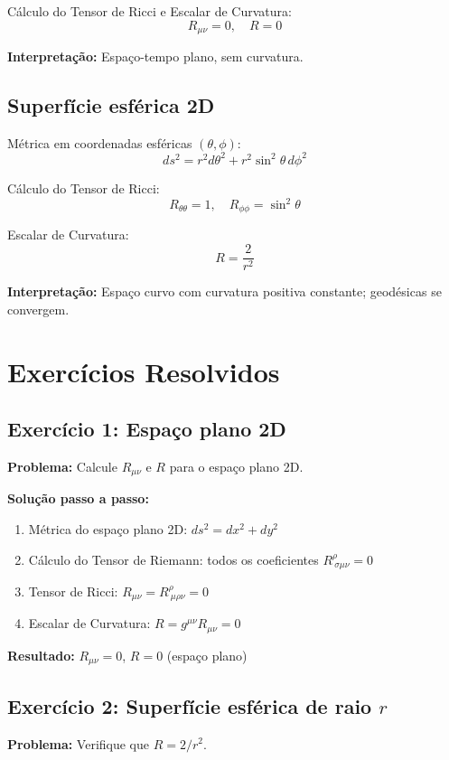 \documentclass[12pt]{article}
\begin{document}
Cálculo do Tensor de Ricci e Escalar de Curvatura:
\[
R_{\mu\nu} = 0, \quad R = 0
\]

\textbf{Interpretação:} Espaço-tempo plano, sem curvatura.

\subsection{Superfície esférica 2D}

Métrica em coordenadas esféricas $(\theta, \phi)$:
\[
ds^2 = r^2 d\theta^2 + r^2 \sin^2\theta\, d\phi^2
\]

Cálculo do Tensor de Ricci:
\[
R_{\theta\theta} = 1, \quad R_{\phi\phi} = \sin^2\theta
\]

Escalar de Curvatura:
\[
R = \frac{2}{r^2}
\]

\textbf{Interpretação:} Espaço curvo com curvatura positiva constante; geodésicas se convergem.

\section{Exercícios Resolvidos}

\subsection*{Exercício 1: Espaço plano 2D}

\textbf{Problema:} Calcule $R_{\mu\nu}$ e $R$ para o espaço plano 2D.

\textbf{Solução passo a passo:}
\begin{enumerate}
    \item Métrica do espaço plano 2D: $ds^2 = dx^2 + dy^2$
    \item Cálculo do Tensor de Riemann: todos os coeficientes $R^\rho_{\ \sigma\mu\nu} = 0$
    \item Tensor de Ricci: $R_{\mu\nu} = R^\rho_{\ \mu\rho\nu} = 0$
    \item Escalar de Curvatura: $R = g^{\mu\nu} R_{\mu\nu} = 0$
\end{enumerate}

\textbf{Resultado:} $R_{\mu\nu} = 0$, $R = 0$ (espaço plano)

\subsection*{Exercício 2: Superfície esférica de raio $r$}

\textbf{Problema:} Verifique que $R = 2/r^2$.
\end{document}
